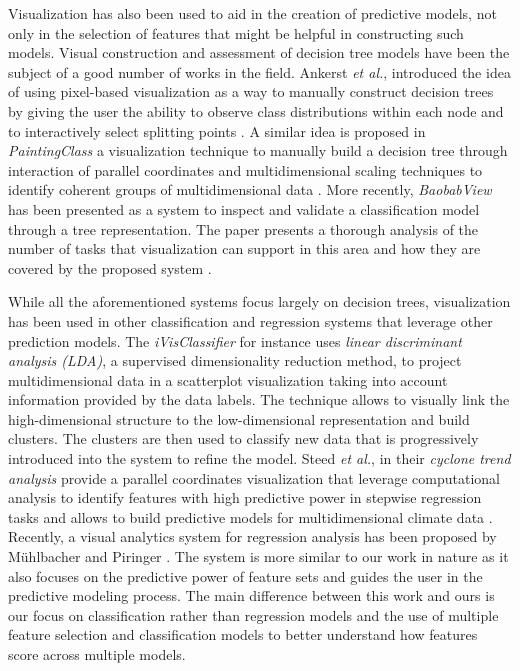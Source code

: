 Visualization has also been used to aid in the creation of predictive models, not only in the selection of features that might be helpful in constructing such models. Visual construction and assessment of decision tree models have been the subject of a good number of works in the field. Ankerst \emph{et al.}, introduced the idea of using pixel-based visualization as a way to manually construct decision trees by giving the user the ability to observe class distributions within each node and to interactively select splitting points \cite{ankerst1999visual, ankerst2000towards}. A similar idea is proposed in \textit{PaintingClass} a visualization technique to manually build a decision tree through interaction of parallel coordinates and multidimensional scaling techniques to identify coherent groups of multidimensional data \cite{Teoh:2003:PIC:956750.956837}. More recently, \textit{BaobabView} has been presented as a system to inspect and validate a classification model through a tree representation. The paper presents a thorough analysis of the number of tasks that visualization can support in this area and how they are covered by the proposed system \cite{van2011baobabview}.

While all the aforementioned systems focus largely on decision trees, visualization has been used in other classification and regression systems that leverage other prediction models. The \textit{iVisClassifier} \cite{choo2010ivisclassifier} for instance uses \textit{linear discriminant analysis (LDA)}, a supervised dimensionality reduction method, to project multidimensional data in a scatterplot visualization taking into account information provided by the data labels. The technique allows to visually link the high-dimensional structure to the low-dimensional representation and build clusters. The clusters are then used to classify new data that is progressively introduced into the system to refine the model. Steed \emph{et al.}, in their \textit{cyclone trend analysis} provide a parallel coordinates visualization that leverage computational analysis to identify features with high predictive power in stepwise regression tasks and allows to build predictive models for multidimensional climate data \cite{steed2009guided, steed2009tropical}. Recently, a visual analytics system for regression analysis has been proposed by M\"uhlbacher and Piringer \cite{muhlbacher2013partition}. The system is more similar to our work in nature as it also focuses on the predictive power of feature sets and guides the user in the predictive modeling process. The main difference between this work and ours is our focus on classification rather than regression models and the use of multiple feature selection and classification models to better understand how features score across multiple models.

